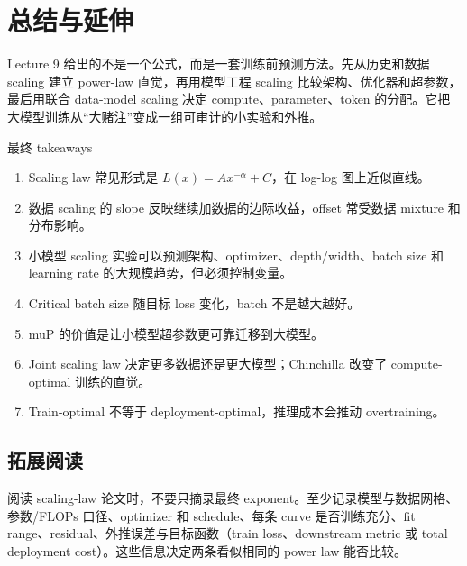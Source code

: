 \section{总结与延伸}

Lecture 9 给出的不是一个公式，而是一套训练前预测方法。先从历史和数据 scaling 建立 power-law 直觉，再用模型工程 scaling 比较架构、优化器和超参数，最后用联合 data-model scaling 决定 compute、parameter、token 的分配。它把大模型训练从“大赌注”变成一组可审计的小实验和外推。

\begin{importantbox}{最终 takeaways}
\begin{enumerate}
    \item Scaling law 常见形式是 \(L(x)=A x^{-\alpha}+C\)，在 log-log 图上近似直线。
    \item 数据 scaling 的 slope 反映继续加数据的边际收益，offset 常受数据 mixture 和分布影响。
    \item 小模型 scaling 实验可以预测架构、optimizer、depth/width、batch size 和 learning rate 的大规模趋势，但必须控制变量。
    \item Critical batch size 随目标 loss 变化，batch 不是越大越好。
    \item muP 的价值是让小模型超参数更可靠迁移到大模型。
    \item Joint scaling law 决定更多数据还是更大模型；Chinchilla 改变了 compute-optimal 训练的直觉。
    \item Train-optimal 不等于 deployment-optimal，推理成本会推动 overtraining。
\end{enumerate}
\end{importantbox}

\subsection{拓展阅读}

阅读 scaling-law 论文时，不要只摘录最终 exponent。至少记录模型与数据网格、参数/FLOPs 口径、optimizer 和 schedule、每条 curve 是否训练充分、fit range、residual、外推误差与目标函数（train loss、downstream metric 或 total deployment cost）。这些信息决定两条看似相同的 power law 能否比较。

